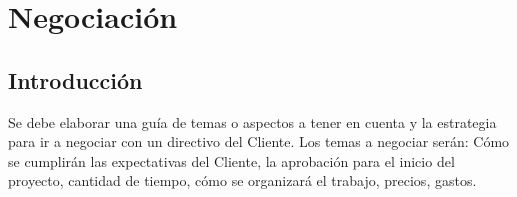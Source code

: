 \newpage

\section{Negociación}

\subsection{Introducción}

Se debe elaborar una guía de temas o aspectos a tener en cuenta y la estrategia para ir a negociar con un directivo del Cliente. Los temas a negociar serán: Cómo se cumplirán las expectativas del Cliente, la aprobación para el inicio del proyecto, cantidad de tiempo, cómo se organizará el trabajo, precios, gastos. 


